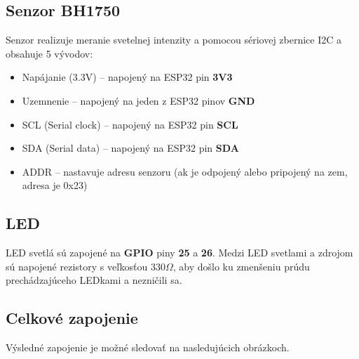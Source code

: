 \documentclass[a4paper]{article}
\begin{document}
\subsection*{Senzor BH1750}
Senzor realizuje meranie svetelnej intenzity a pomocou sériovej zbernice I2C \cite{I2Cdoc} a obsahuje 5 vývodov:
\begin{itemize}
    \item Napájanie (3.3V) -- napojený na ESP32 pin \textbf{3V3}
    \item Uzemnenie -- napojený na jeden z ESP32 pinov \textbf{GND}
    \item SCL (Serial clock) -- napojený na ESP32 pin \textbf{SCL}
    \item SDA (Serial data) -- napojený na ESP32 pin \textbf{SDA}
    \item ADDR -- nastavuje adresu senzoru (ak je odpojený alebo pripojený na zem, adresa je 0x23)
\end{itemize}

\subsection*{LED}
LED svetlá sú zapojené na \textbf{GPIO} piny \textbf{25} a \textbf{26}. Medzi LED svetlami a zdrojom sú napojené rezistory s veľkosťou 330$\Omega$, aby došlo ku zmenšeniu prúdu prechádzajúceho LEDkami a nezničili sa.

\subsection*{Celkové zapojenie}
Výsledné zapojenie je možné sledovať na nasledujúcich obrázkoch.
\end{document}
